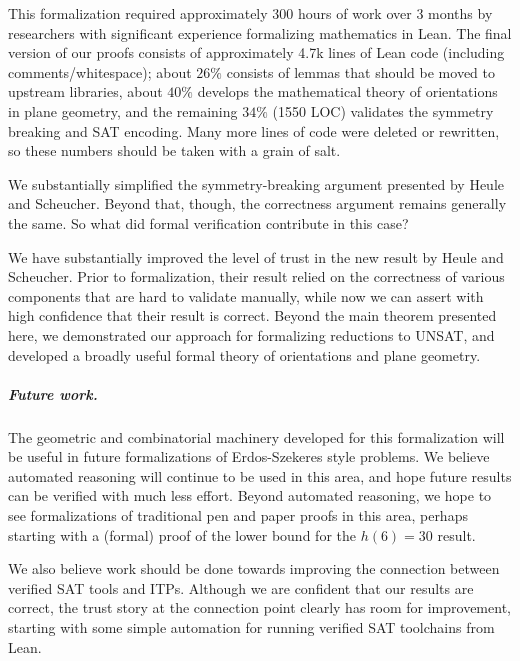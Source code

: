 This formalization required approximately 300 hours of work over 3 months
by researchers with significant experience formalizing mathematics in Lean.
The final version of our proofs consists of approximately 4.7k lines of Lean code
(including comments/whitespace);
about $26\%$ consists of lemmas that should be moved to upstream libraries,
about $40\%$ develops the mathematical theory of orientations in plane geometry,
and the remaining $34\%$ (1550 LOC) validates the symmetry breaking and SAT encoding.
Many more lines of code were deleted or rewritten,
so these numbers should be taken with a grain of salt.

We substantially simplified the symmetry-breaking argument presented by Heule and Scheucher.
Beyond that, though, the correctness argument remains generally the same.
So what did formal verification contribute in this case?

We have substantially improved the level of trust in the new result by Heule and Scheucher.
Prior to formalization,
their result relied on the correctness of various components that are hard to validate manually,
while now we can assert with high confidence that their result is correct.
Beyond the main theorem presented here,
we demonstrated our approach for formalizing reductions to UNSAT,
and developed a broadly useful formal theory of orientations and plane geometry.

\subparagraph*{Future work.}
The geometric and combinatorial machinery developed for this formalization
will be useful in future formalizations of Erdos-Szekeres style problems.
We believe automated reasoning will continue to be used in this area,
and hope future results can be verified with much less effort.
Beyond automated reasoning,
we hope to see formalizations of traditional pen and paper proofs in this area,
perhaps starting with a (formal) proof of the lower bound for the $h(6) = 30$ result.

We also believe work should be done towards improving the connection between verified SAT tools and ITPs.
Although we are confident that our results are correct,
the trust story at the connection point clearly has room for improvement,
starting with some simple automation for running verified SAT toolchains from Lean.
